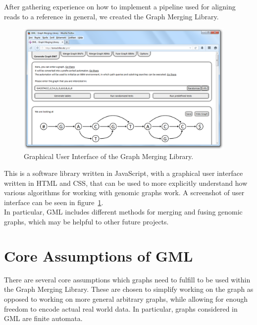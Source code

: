 \documentclass[a4paper,12pt,twoside,BCOR=10mm]{scrbook}
\begin{document}
After gathering experience on how to implement a pipeline used for aligning reads to a reference in general, 
we created the Graph Merging Library. 
\begin{figure}[!htb]
\centering
\includegraphics[width=0.95\textwidth]{evo_gml_3.png}
\caption[GUI of the Graph Merging Library]{Graphical User Interface of the Graph Merging Library.} \label{fig:evo_gml_3}
\end{figure}
This is a software library written in JavaScript, with a graphical user interface written in HTML and CSS, 
that can be used to more explicitly understand how various algorithms for working with genomic graphs work. 
A screenshot of user interface can be seen in figure~\ref{fig:evo_gml_3}. \\
In particular, GML includes different methods for merging and fusing genomic graphs, 
which may be helpful to other future projects.

\section{Core Assumptions of GML}
\label{sec:gml_core_assumptions}
%

There are several core assumptions which graphs need to fulfill to be used within the Graph Merging Library. 
These are chosen to simplify working on the graph as opposed to working on more general arbitrary graphs, 
while allowing for enough freedom to encode actual real world data. 
In particular, graphs considered in GML are finite automata.
\end{document}
